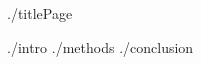 \documentclass{article}
\begin{document}
{./titlePage} 


\frontmatter
\tableofcontents

\mainmatter

{./intro}
{./methods}
\newpage
{./conclusion}

\newpage
\printbibliography
\end{document}
